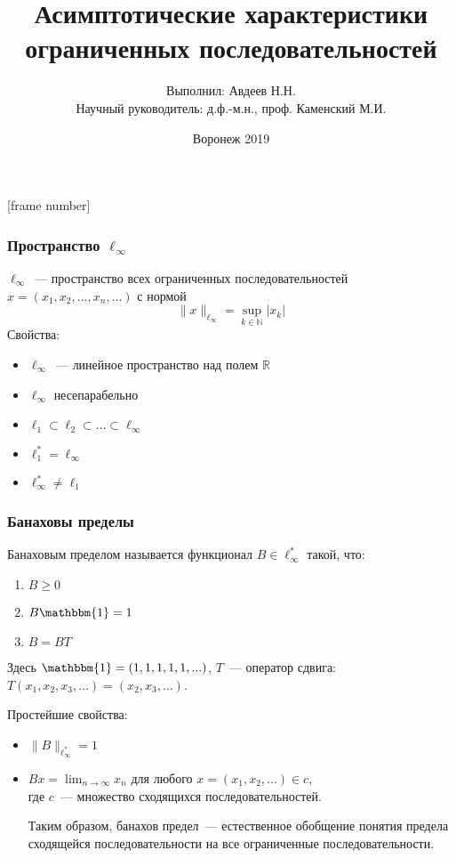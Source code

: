 \documentclass[10pt,pdf,hyperref={unicode}]{beamer}
\theoremstyle{definition}
\begin{document}
\title{Асимптотические характеристики \\ ограниченных последовательностей}
\author{Выполнил: Авдеев Н.Н. \\ Научный руководитель: д.ф.-м.н., проф. Каменский М.И.}
\date{Воронеж 2019}

\maketitle

[frame number]

\begin{frame}
	\frametitle{Пространство $\ell_\infty$}
	$\ell_\infty$~--- пространство всех ограниченных последовательностей
	$x=(x_1, x_2, ..., x_n, ...)$
	с нормой
	$$
		\|x\|_{\ell_\infty} = \sup_{k\in\mathbb{N}} |x_k|
	$$
	{Свойства:}

	\begin{itemize}
		\item
			$\ell_\infty$~--- линейное пространство над полем $\mathbb{R}$
		\item
			$\ell_\infty$  несепарабельно
		\item
			$\ell_1 \subset \ell_2 \subset \dots \subset \ell_\infty$
		\item
			$\ell_1^* = \ell_\infty$
		\item
			$\ell_\infty^* \neq \ell_1$
	\end{itemize}
\end{frame}

\begin{frame}\frametitle{Банаховы пределы}
	Банаховым пределом называется функционал $B\in \ell_\infty^*$ такой, что:
	\begin{enumerate}
		\item
			$B \geqslant 0$
		\item
			$B\mathbbm{1} = 1$
		\item
			$B=BT$
	\end{enumerate}
	Здесь $\mathbbm{1}=(1,1,1,1,1,...)$,
	$T$~--- оператор сдвига: $T(x_1, x_2, x_3, ...) = (x_2, x_3, ...)$.

	Простейшие свойства:
	\begin{itemize}
		\item
			$\|B\|_{\ell_\infty^*} = 1$
		\item
			$Bx = \lim_{n\to\infty} x_n$ для любого $x=(x_1, x_2, ...) \in c$,
			\\
			где $c$~--- множество сходящихся последовательностей.

			Таким образом,
			банахов предел~--- естественное обобщение понятия предела сходящейся последовательности
			на все ограниченные последовательности.
	\end{itemize}
\end{frame}
\end{document}
